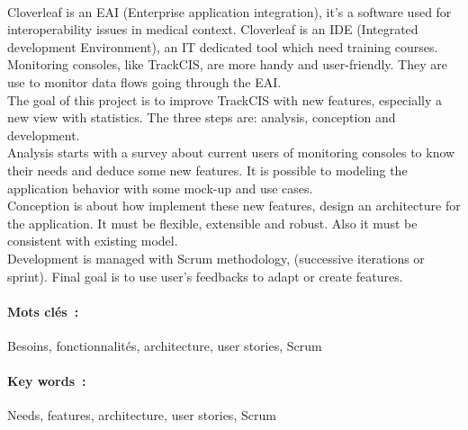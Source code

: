 	\paragraph{}
	Cloverleaf is an EAI (Enterprise application integration), it’s a software used
	for interoperability issues in medical context. Cloverleaf is an IDE
	(Integrated development Environment), an IT dedicated tool which need training
	courses. Monitoring consoles, like TrackCIS, are more handy and user-friendly.
	They are use to monitor data flows going through the EAI.\\
	The goal of this project is to improve TrackCIS with new features, especially a
	new view with statistics. The three steps are: analysis, conception and
	development.\\
	Analysis starts with a survey about current users of monitoring consoles to
	know their needs and deduce some new features. It is possible to modeling the
	application behavior with some mock-up and use cases.\\
	Conception is about how implement these new features, design an architecture
	for the application. It must be flexible, extensible and robust. Also it must
	be consistent with existing model.\\
	Development is managed with Scrum methodology, (successive iterations or
	sprint). Final goal is to use user’s feedbacks to adapt or create features.
	
	\paragraph{Mots clés~: }
	Besoins, fonctionnalités, architecture, user stories, Scrum
	
	\paragraph{Key words~: }
	Needs, features, architecture, user stories, Scrum
	
	
	
	